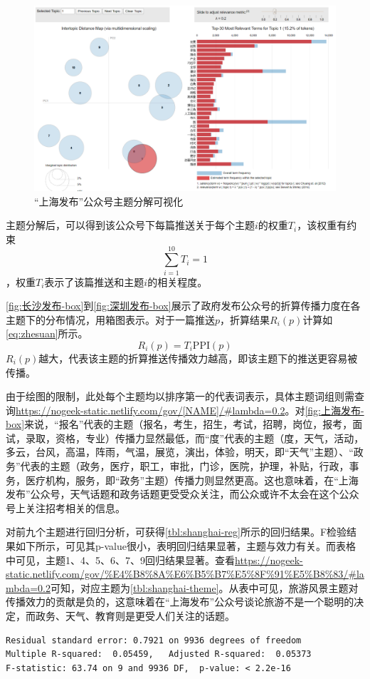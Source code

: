 \documentclass[a4paper,12pt,UTF8]{article}
\begin{document}
    \begin{figure}[htbp]
      \centering
      \includegraphics[width=0.9\linewidth]{shanghai-vis.png}
      \caption{“上海发布”公众号主题分解可视化}
      \label{fig:shanghai-vis}
    \end{figure}

    主题分解后，可以得到该公众号下每篇推送关于每个主题$i$的权重$T_i$，该权重有约束$$\sum_{i=1}^{10}T_i=1$$，权重$T_i$表示了该篇推送和主题$i$的相关程度。

    \cref{fig:长沙发布-box}到\cref{fig:深圳发布-box}展示了政府发布公众号的折算传播力度在各主题下的分布情况，用箱图表示。对于一篇推送$p$，折算结果$R_i(p)$计算如\cref{eq:zhesuan}所示。
    \begin{equation}
      \label{eq:zhesuan}
      R_i(p) = T_i\text{PPI}(p)
    \end{equation}
    $R_i(p)$越大，代表该主题的折算推送传播效力越高，即该主题下的推送更容易被传播。
    
    由于绘图的限制，此处每个主题均以排序第一的代表词表示，具体主题词组则需查询\url{https://nogeek-static.netlify.com/gov/[NAME]/#lambda=0.2}。对\cref{fig:上海发布-box}来说，“报名”代表的主题（报名，考生，招生，考试，招聘，岗位，报考，面试，录取，资格，专业）传播力显然最低，而“度”代表的主题（度，天气，活动，多云，台风，高温，阵雨，气温，展览，演出，体验，明天，即“天气”主题）、“政务”代表的主题（政务，医疗，职工，审批，门诊，医院，护理，补贴，行政，事务，医疗机构，服务，即“政务”主题）传播力则显然更高。这也意味着，在“上海发布”公众号，天气话题和政务话题更受受众关注，而公众或许不太会在这个公众号上关注招考相关的信息。

    对前九个主题进行回归分析，可获得\cref{tbl:shanghai-reg}所示的回归结果。F检验结果如下所示，可见其p-value很小，表明回归结果显著，主题与效力有关。而表格中可见，主题1、4、5、6、7、9回归结果显著。查看\url{https://nogeek-static.netlify.com/gov/%E4%B8%8A%E6%B5%B7%E5%8F%91%E5%B8%83/#lambda=0.2}可知，对应主题为\cref{tbl:shanghai-theme}。从表中可见，旅游风景主题对传播效力的贡献是负的，这意味着在“上海发布”公众号谈论旅游不是一个聪明的决定，而政务、天气、教育则是更受人们关注的话题。
    \begin{lstlisting}
Residual standard error: 0.7921 on 9936 degrees of freedom
Multiple R-squared:  0.05459,	Adjusted R-squared:  0.05373 
F-statistic: 63.74 on 9 and 9936 DF,  p-value: < 2.2e-16
    \end{lstlisting}
    
\end{document}
